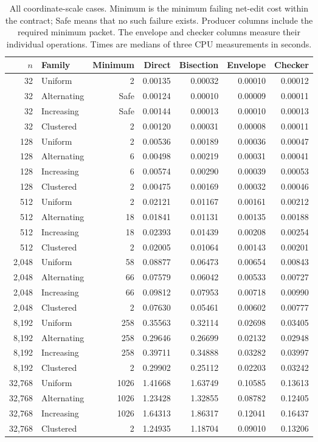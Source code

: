 \begin{table}[t]
\caption{All coordinate-scale cases. Minimum is the minimum failing net-edit cost within the contract; Safe means that no such failure exists. Producer columns include the required minimum packet. The envelope and checker columns measure their individual operations. Times are medians of three CPU measurements in seconds.}
\label{tab:scaling}
\begin{tabular}{rlrrrrr}
\toprule
$n$ & Family & Minimum & Direct & Bisection & Envelope & Checker\\
\midrule
32 & Uniform & 2 & 0.00135 & 0.00032 & 0.00010 & 0.00012 \\
32 & Alternating & Safe & 0.00124 & 0.00010 & 0.00009 & 0.00011 \\
32 & Increasing & Safe & 0.00144 & 0.00013 & 0.00010 & 0.00013 \\
32 & Clustered & 2 & 0.00120 & 0.00031 & 0.00008 & 0.00011 \\
128 & Uniform & 2 & 0.00536 & 0.00189 & 0.00036 & 0.00047 \\
128 & Alternating & 6 & 0.00498 & 0.00219 & 0.00031 & 0.00041 \\
128 & Increasing & 6 & 0.00574 & 0.00290 & 0.00039 & 0.00053 \\
128 & Clustered & 2 & 0.00475 & 0.00169 & 0.00032 & 0.00046 \\
512 & Uniform & 2 & 0.02121 & 0.01167 & 0.00161 & 0.00212 \\
512 & Alternating & 18 & 0.01841 & 0.01131 & 0.00135 & 0.00188 \\
512 & Increasing & 18 & 0.02393 & 0.01439 & 0.00208 & 0.00254 \\
512 & Clustered & 2 & 0.02005 & 0.01064 & 0.00143 & 0.00201 \\
2,048 & Uniform & 58 & 0.08877 & 0.06473 & 0.00654 & 0.00843 \\
2,048 & Alternating & 66 & 0.07579 & 0.06042 & 0.00533 & 0.00727 \\
2,048 & Increasing & 66 & 0.09812 & 0.07953 & 0.00718 & 0.00990 \\
2,048 & Clustered & 2 & 0.07630 & 0.05461 & 0.00602 & 0.00777 \\
8,192 & Uniform & 258 & 0.35563 & 0.32114 & 0.02698 & 0.03405 \\
8,192 & Alternating & 258 & 0.29646 & 0.26699 & 0.02132 & 0.02948 \\
8,192 & Increasing & 258 & 0.39711 & 0.34888 & 0.03282 & 0.03997 \\
8,192 & Clustered & 2 & 0.29902 & 0.25112 & 0.02203 & 0.03242 \\
32,768 & Uniform & 1026 & 1.41668 & 1.63749 & 0.10585 & 0.13613 \\
32,768 & Alternating & 1026 & 1.23428 & 1.32855 & 0.08782 & 0.12405 \\
32,768 & Increasing & 1026 & 1.64313 & 1.86317 & 0.12041 & 0.16437 \\
32,768 & Clustered & 2 & 1.24935 & 1.18704 & 0.09010 & 0.13206 \\
\bottomrule
\end{tabular}
\end{table}
